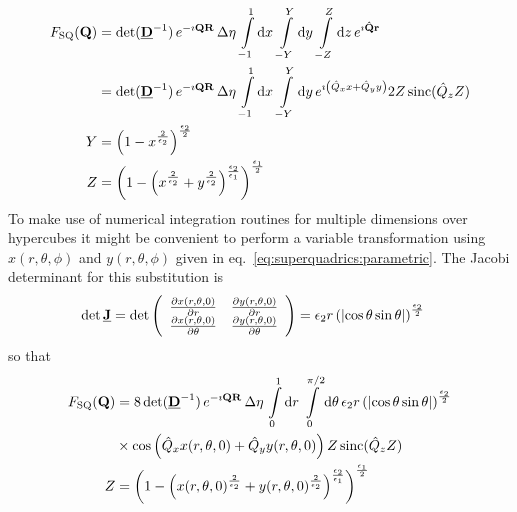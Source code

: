 \begin{align}\label{eq:FTsuperquadrics}
  F_\mathrm{SQ}(\B{Q}) &=
\det(\M{D}^{-1})\, e^{-\imath\B{QR}}\, \Delta\eta\, \int\limits_{-1}^1
\mathrm{d}x\, \int\limits_{-Y}^{Y} \mathrm{d}y\,  \int\limits_{-Z}^{Z} \mathrm{d}z \,
e^{\imath\B{\hat{Q}r}} \nonumber \\
 &=
\det(\M{D}^{-1})\, e^{-\imath\B{QR}}\, \Delta\eta\, \int\limits_{-1}^1
\mathrm{d}x\, \int\limits_{-Y}^{Y} \mathrm{d}y\,
e^{\imath\left(\hat{Q}_xx+\hat{Q}_yy\right)} 2Z\operatorname{sinc}(\hat{Q}_z Z)\nonumber \\
Y &= \left(1-x^{\frac{2}{\epsilon_2}}\right)^{\frac{\epsilon_2}{2}}\\
Z &= \left(1-\left(x^{\frac{2}{\epsilon_2}}+y^{\frac{2}{\epsilon_2}}\right)^{\frac{\epsilon_2}{\epsilon_1}}\right)^{\frac{\epsilon_1}{2}}
\end{align}
To make use of numerical integration routines for multiple dimensions over hypercubes it might be convenient to perform a variable transformation using $ x(r,\theta,\phi)$ and $ y(r,\theta,\phi)$ given in eq.\ \ref{eq:superquadrics:parametric}. The Jacobi determinant for this substitution is
\begin{align}\label{eq:detJ_superquadrics}
  \det{\M{J}} &= \det
  \left(
    \begin{array}{cc}
      \frac{\partial x(r,\theta,0)}{\partial r}      & \frac{\partial y(r,\theta,0)}{\partial r}\\
      \frac{\partial x(r,\theta,0)}{\partial \theta} & \frac{\partial y(r,\theta,0)}{\partial \theta}
    \end{array}
  \right) = \epsilon_2 r \left(\abs{\cos\theta\sin\theta} \right)^{\frac{\epsilon_2}{2}}
\end{align}
so that
\begin{align}
\begin{split}
F_\mathrm{SQ}(\B{Q}) &= 8 \det(\M{D}^{-1})\, e^{-\imath\B{QR}}\, \Delta\eta\,\int\limits_{0}^1
\mathrm{d}r\, \int\limits_{0}^{\pi/2} \mathrm{d}\theta\,  \epsilon_2 r \left(\abs{\cos\theta\sin\theta} \right)^{\frac{\epsilon_2}{2}}\\
     &\times \cos\left(\hat{Q}_xx(r,\theta,0)+\hat{Q}_yy(r,\theta,0)\right) Z\operatorname{sinc}(\hat{Q}_z Z)\nonumber \\
Z &= \left(1-\left(x(r,\theta,0)^{\frac{2}{\epsilon_2}}+y(r,\theta,0)^{\frac{2}{\epsilon_2}}\right)^{\frac{\epsilon_2}{\epsilon_1}}\right)^{\frac{\epsilon_1}{2}}
\end{split}
\end{align}

